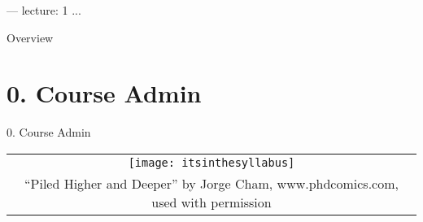 ---
lecture: 1
...

\begin{frame}
	\maketitle
\end{frame}

\begin{frame}{Overview}
\tableofcontents[pausesections]
\end{frame}

\section{0. Course Admin}
\begin{frame}{0. Course Admin}

	\begin{center}
		\begin{tabular}{c}
		\texttt{[image: itsinthesyllabus]}\\
		{\tiny \textcopyright ``Piled Higher and Deeper'' by Jorge Cham,
www.phdcomics.com, used with permission}
		\end{tabular}
	\end{center}

\end{frame}


